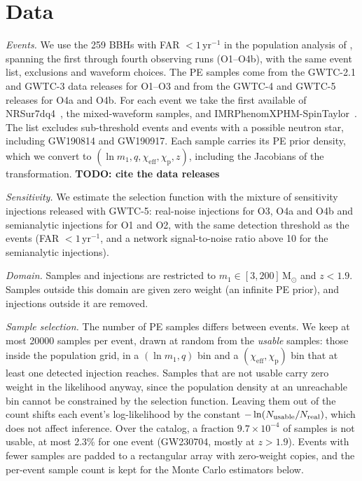 \documentclass[%
 reprint,
 amsmath,amssymb,
 aps,
 prl,
 nofootinbib,nobibnotes,
 floatfix,
]{revtex4-2}
\newcommand{\Msun}{\ensuremath{\mathrm{M}_{\odot}}}
\newcommand{\chieff}{\ensuremath{\chi_{\mathrm{eff}}}}
\newcommand{\chip}{\ensuremath{\chi_{\mathrm{p}}}}
\newcommand{\peryear}{\ensuremath{\,\mathrm{yr}^{-1}}}
\newcommand{\todo}[1]{{\color{Blue}\bf TODO: #1}}
\begin{document}
\section{Data}
\label{sm: data}

\textit{Events.} We use the 259 \acp{BBH} with \ac{FAR} $< 1\peryear$ in the population analysis of \citet{LIGOScientific:2026ctl}, spanning the first through fourth observing runs (O1--O4b), with the same event list, exclusions and waveform choices. The \ac{PE} samples come from the GWTC-2.1 and GWTC-3 data releases for O1--O3 and from the GWTC-4 and GWTC-5 releases for O4a and O4b. For each event we take the first available of NRSur7dq4~\cite{Varma:2019csw}, the mixed-waveform samples, and IMRPhenomXPHM-SpinTaylor~\cite{Pratten:2020ceb}. The list excludes sub-threshold events and events with a possible neutron star, including GW190814 and GW190917. Each sample carries its \ac{PE} prior density, which we convert to $(\ln m_1, q, \chieff, \chip, z)$, including the Jacobians of the transformation. \todo{cite the data releases}

\textit{Sensitivity.} We estimate the selection function with the mixture of sensitivity injections released with \ac{GWTC-5}: real-noise injections for O3, O4a and O4b and semianalytic injections for O1 and O2, with the same detection threshold as the events (\ac{FAR} $< 1\peryear$, and a network signal-to-noise ratio above 10 for the semianalytic injections).

\textit{Domain.} Samples and injections are restricted to $m_1 \in [3, 200]\,\Msun$ and $z < 1.9$. Samples outside this domain are given zero weight (an infinite \ac{PE} prior), and injections outside it are removed.

\textit{Sample selection.} The number of \ac{PE} samples differs between events. We keep at most 20000 samples per event, drawn at random from the \emph{usable} samples: those inside the population grid, in a $(\ln m_1, q)$ bin and a $(\chieff, \chip)$ bin that at least one detected injection reaches. Samples that are not usable carry zero weight in the likelihood anyway, since the population density at an unreachable bin cannot be constrained by the selection function. Leaving them out of the count shifts each event's log-likelihood by the constant $-\ln(N_{\rm usable}/N_{\rm real})$, which does not affect inference. Over the catalog, a fraction $9.7 \times 10^{-4}$ of samples is not usable, at most 2.3\% for one event (GW230704, mostly at $z > 1.9$). Events with fewer samples are padded to a rectangular array with zero-weight copies, and the per-event sample count is kept for the Monte Carlo estimators below.
\end{document}
